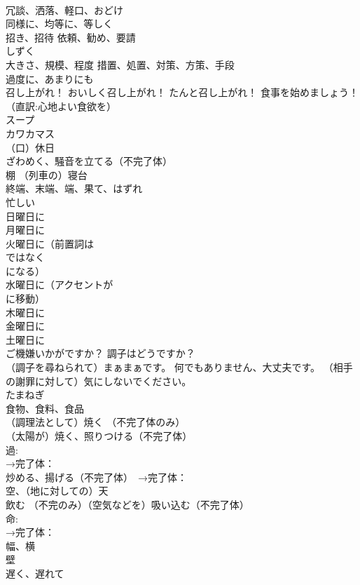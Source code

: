 \documentclass[8pt]{extreport}
\begin{document}
\begin{CJK}{UTF8}{min}
\\	冗談、洒落、軽口、おどけ
\\	同様に、均等に、等しく
\\	招き、招待 依頼、勧め、要請
\\	しずく
\\	大きさ、規模、程度 措置、処置、対策、方策、手段
\\	過度に、あまりにも
\\	召し上がれ！ おいしく召し上がれ！ たんと召し上がれ！ 食事を始めましょう！ （直訳:心地よい食欲を）
\\	スープ
\\	カワカマス
\\	（口）休日
\\	ざわめく、騒音を立てる（不完了体）
\\	棚 （列車の）寝台
\\	終端、末端、端、果て、はずれ
\\	忙しい
\\	日曜日に
\\	月曜日に
\\	火曜日に（前置詞は
\\	ではなく
\\	になる）
\\	水曜日に（アクセントが
\\	に移動）
\\	木曜日に
\\	金曜日に
\\	土曜日に
\\	ご機嫌いかがですか？ 調子はどうですか？
\\	（調子を尋ねられて）まぁまぁです。 何でもありません、大丈夫です。 （相手の謝罪に対して）気にしないでください。
\\	たまねぎ
\\	食物、食料、食品
\\	（調理法として）焼く （不完了体のみ）
\\	（太陽が）焼く、照りつける（不完了体） 
\\	過:
\\	→完了体：
\\	炒める、揚げる（不完了体）　→完了体：
\\	空、（地に対しての）天
\\	飲む （不完のみ）（空気などを）吸い込む（不完了体）
\\	命:
\\	→完了体：
\\	幅、横
\\	壁
\\	遅く、遅れて

\end{CJK}
\end{document}
